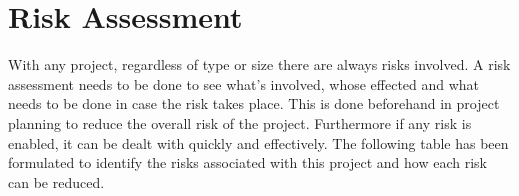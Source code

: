 \section{Risk Assessment}

With any project, regardless of type or size there are always risks involved. A risk assessment needs to be done to see what's involved, whose effected and what needs to be done in case the risk takes place. This is done beforehand in project planning to reduce the overall risk of the project. Furthermore if any risk is enabled, it can be dealt with quickly and effectively. The following table has been formulated to identify the risks associated with this project and how each risk can be reduced.

\begin{center}


\end{center}

